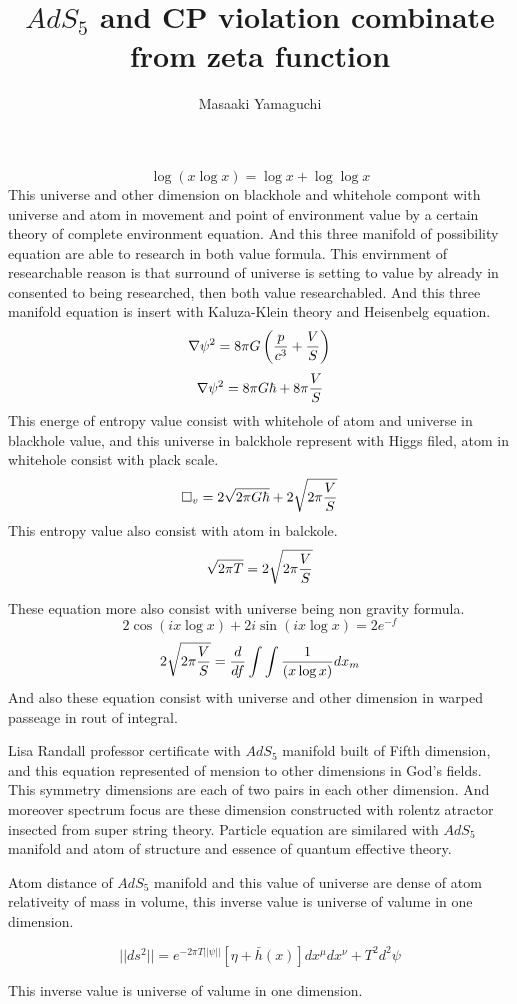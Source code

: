 \documentclass{jsarticle}
\begin{document}
{  $$ \log(x \log x) = \log x + \log \log x $$
  This universe and other dimension on blackhole and whitehole
  compont with universe and atom in movement and point of 
  environment value by a certain theory of complete environment 
  equation. And this three manifold of possibility equation 
  are able to research in both value formula.
  This envirnment of researchable reason is that surround of universe
  is setting to value by already in consented to being researched,
  then both value researchabled.
  And this three manifold equation is insert with Kaluza-Klein theory
  and Heisenbelg equation.
    $$ \nabla \psi^2 = 8 \pi G\left({p \over c^3} + {V \over S}\right) $$
  $$ \nabla \psi^2 = 8 \pi G \hbar + 8 \pi {V \over S} $$
  This energe of entropy value consist with whitehole of atom
  and universe in blackhole value, and this universe in balckhole 
  represent with Higgs filed, atom in whitehole consist with plack scale.
    $$ \square_v = 2 \sqrt{2 \pi G \hbar} + 2 \sqrt{2 \pi {V \over S}} $$
  This entropy value also consist with atom in balckole.
    $$ \sqrt{2 \pi T} = 2 \sqrt{2 \pi{V \over S}} $$

  These equation more also consist with universe being non gravity formula.
    $$ 2 \cos (i x \log x) + 2 i \sin(i x \log x) = 2 e^{-f} $$
  $$ 2 \sqrt{2 \pi {V \over S}} = {d \over df} 
  \int \int{1 \over (x \log x)}dx_m$$
  And also these equation consist with universe and other dimension in
  warped passeage in rout of integral.

\newpage
\title{$AdS_5 $ and CP violation combinate from zeta function}
\author{Masaaki Yamaguchi}


    Lisa Randall professor certificate with $AdS_5 $ manifold built of
  Fifth dimension, and this equation represented of 
  mension to other dimensions in God's fields.
  This symmetry dimensions are each of two pairs in each other dimension.
  And moreover spectrum focus are these dimension constructed with
  rolentz atractor insected from super string theory.
   Particle equation are similared with $AdS_5 $ manifold and atom of structure
   and essence of quantum effective theory.

    Atom distance of $AdS_5 $ manifold and this value of universe are dense of 
  atom relativeity of mass in volume, this inverse value is universe of valume
  in one dimension.

  $$ ||ds^2|| = e^{-2\pi T||\psi||}[\eta + \bar{h}(x)]dx^{\mu}dx^{\nu}
  + T^2 d^2 \psi $$

     This inverse value is universe of valume in one dimension.

}
\end{document}
